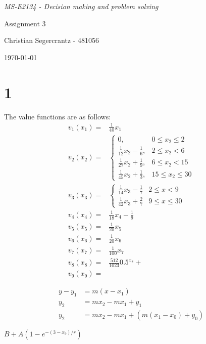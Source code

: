 \documentclass{article}
\begin{document}
	\textit{MS-E2134 - Decision making and problem solving}
	\vfill
	{\centering \Huge Assignment 3 \par}
	\vfill
	Christian Segercrantz - 481056 \\
	\par \today
	\pagebreak
	\tableofcontents
	\pagebreak
\section{1}
The value functions are as follows:
\begin{align}
	v_1(x_1) =& \frac{1}{40}x_1 \\
	v_2(x_2) =& 
		\begin{cases}
		 0,& 0 \leq x_2 \leq 2 \\
		 \frac{1}{12}x_2 -\frac{1}{6},& 2 \leq x_2 < 6 \\
		 \frac{1}{27}x_2 +\frac{1}{9},& 6 \leq x_2 < 15 \\
		 \frac{1}{45}x_2 +\frac{1}{3},& 15 \leq x_2 \leq 30
		\end{cases}\\
	v_3(x_3) =&
		\begin{cases}
			\frac{1}{14}x_3 - \frac{1}{7} & 2 \leq x <9\\
			\frac{1}{42}x_3 + \frac{2}{7} & 9 \leq x \leq 30
		\end{cases} \\
	v_4(x_4) =& \frac{1}{18}x_4 - \frac{1}{9}\\ 
	v_5(x_5) =& \frac{1}{20}x_5\\
	v_6(x_6) =& \frac{1}{20}x_6\\
	v_7(x_7) =& \frac{1}{100}x_7\\
	v_8(x_8) =& \frac{512}{1023}0.5^{x_8} + \\
	v_9(x_9) =&
\end{align}

\begin{align}
	y-y_1 &= m(x-x_1) \\
	y_2 &= mx_2-mx_1+y_1 \\
	y_2 &= mx_2-mx_1+(m(x_1-x_0)+y_0)
\end{align}

$B+A(1-e^{-(3-x_9)/r})$
\end{document}
